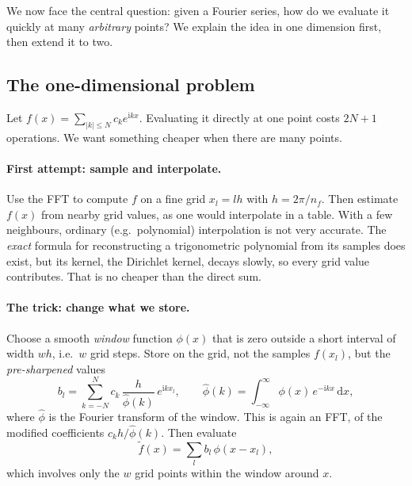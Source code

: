 \documentclass[11pt,a4paper]{article}
\theoremstyle{definition}
\newcommand{\ii}{\mathrm{i}}
\newcommand{\dd}{\mathrm{d}}
\begin{document}
We now face the central question: given a Fourier series, how do we evaluate it quickly at many \emph{arbitrary}
points? We explain the idea in one dimension first, then extend it to two.

\subsection{The one-dimensional problem}
Let $f(x)=\sum_{|k|\le N}c_ke^{\ii kx}$. Evaluating it directly at one point costs $2N+1$ operations. We want something cheaper
when there are many points.

\paragraph{First attempt: sample and interpolate.} Use the FFT to compute $f$ on a fine grid $x_l=lh$ with
$h=2\pi/n_f$. Then estimate $f(x)$ from nearby grid values, as one would interpolate in a table. With a few
neighbours, ordinary (e.g.\ polynomial) interpolation is not very accurate. The \emph{exact} formula for reconstructing a
trigonometric polynomial from its samples does exist, but its kernel, the Dirichlet kernel, decays slowly, so every grid value
contributes. That is no cheaper than the direct sum.

\paragraph{The trick: change what we store.} Choose a smooth \emph{window} function $\phi(x)$ that is zero outside a short
interval of width $wh$, i.e.\ $w$ grid steps. Store on the grid, not the samples $f(x_l)$, but the \emph{pre-sharpened}
values
\begin{equation}\label{eq:bl}
b_l=\sum_{k=-N}^{N}c_k\,\frac{h}{\hat\phi(k)}\,e^{\ii kx_l},\qquad
\hat\phi(k)=\int_{-\infty}^{\infty}\phi(x)\,e^{-\ii kx}\,\dd x ,
\end{equation}
where $\hat\phi$ is the Fourier transform of the window. This is again an FFT, of the modified coefficients
$c_kh/\hat\phi(k)$. Then evaluate
\begin{equation}\label{eq:recon}
\tilde f(x)=\sum_{l}b_l\,\phi(x-x_l),
\end{equation}
which involves only the $w$ grid points within the window around $x$.
\end{document}
